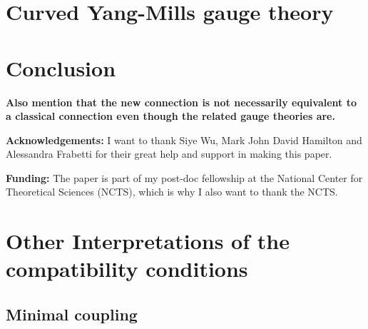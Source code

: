 \documentclass[a4paper,oneside,11pt,bibliography=totoc]{scrartcl}
\renewcommand{\theequation}{\arabic{equation}}
\renewcommand{\listoffigures}{\begingroup
\tocsection
\tocfile{\listfigurename}{lof}
\endgroup}
\renewcommand{\listoftables}{\begingroup
\tocsection
\tocfile{\listtablename}{lot}
\endgroup}
\theoremstyle{plain}
\theoremstyle{remark}
\theoremstyle{definition}
\begin{document}
\section{Curved Yang-Mills gauge theory}

\section{Conclusion}

\textbf{Also mention that the new connection is not necessarily equivalent to a classical connection even though the related gauge theories are.}

\textbf{Acknowledgements:} I want to thank Siye Wu, Mark John David Hamilton and Alessandra Frabetti for their great help and support in making this paper.

\textbf{Funding:} The paper is part of my post-doc fellowship at the National Center for Theoretical Sciences (NCTS), which is why I also want to thank the NCTS.





\appendix
\setcounter{equation}{0}
\renewcommand{\theequation}{\Alph{section}.\arabic{equation}} %

\renewcommand\refname{List of References}






\section{Other Interpretations of the compatibility conditions}

\subsection{Minimal coupling}
\end{document}
